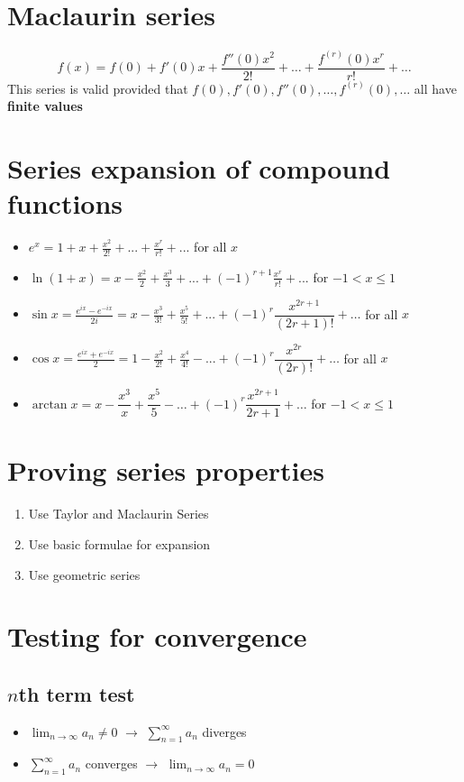 \section{Maclaurin series}
$$f(x)=f(0)+f'(0)x+\frac{f''(0)x^2}{2!}+\dots+\frac{f^{(r)}(0)x^r}{r!}+\dots$$
This series is valid provided that $f(0), f'(0), f''(0),\dots,f^{(r)}(0),\dots$ all have \textbf{finite values}

\section{Series expansion of compound functions}
\begin{itemize}
	\item $e^{x}=1+x+\frac{x^{2}}{2!}+...+\frac{x^{r}}{r!}+...$ for all $x$
	\item $\ln(1+x) = x - \frac{x^{2}}{2} + \frac{x^{3}}{3} + ... + (-1)^{r+1}\frac{x^{r}}{r!} +...$ for $-1<x\leq1$
	\item $\sin x = \frac{e^{ix}-e^{-ix}}{2i}=x-\frac{x^{3}}{3!}+\frac{x^{5}}{5!}+...+(-1)^r\dfrac{x^{2r+1}}{(2r+1)!}+\dots$ for all $x$
	\item $\cos x = \frac{e^{ix}+e^{-ix}}{2}=1-\frac{x^{2}}{2!}+\frac{x^{4}}{4!}-...+(-1)^r\dfrac{x^{2r}}{(2r)!}+\dots$ for all $x$
	\item $\arctan x = x-\dfrac{x^3}{x}+\dfrac{x^5}{5}-\dots+(-1)^r\dfrac{x^{2r+1}}{2r+1}+\dots$ for $-1<x\leq1$
\end{itemize}

\section{Proving series properties}
\begin{enumerate}
	\item Use Taylor and Maclaurin Series
	\item Use basic formulae for expansion
	\item Use geometric series
\end{enumerate}

\section{Testing for convergence}
\subsection{$n$th term test}
\begin{itemize}
    \item $\lim_{n\rightarrow\infty}a_n \neq 0$ $\rightarrow$ $\sum_{n=1}^{\infty}a_n$ diverges
    \item $\sum_{n=1}^{\infty}a_n$ converges $\rightarrow$ $\lim_{n\rightarrow\infty}a_n = 0$
\end{itemize}

